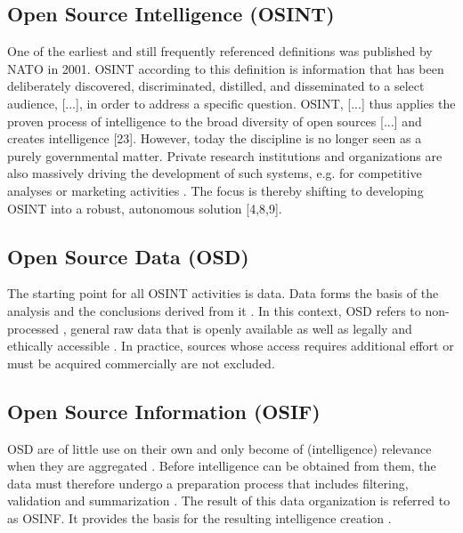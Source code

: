 \documentclass[10pt]{article}
\begin{document}
\subsection{Open Source Intelligence (OSINT)}

One of the earliest and still frequently referenced definitions \cite{DosPassos.2017}
was published by NATO in 2001. OSINT according to this definition is information that has been
deliberately discovered, discriminated, distilled, and disseminated to a select audience,
[...], in order to address a specific question. OSINT, [...] thus applies the proven
process of intelligence to the broad diversity of open sources [...] and creates
intelligence [23]. However, today the discipline is no longer seen as a purely governmental
matter. Private research institutions and organizations \cite{Bohm.2021,Mercado.2005} are
also massively driving the development of such systems, e.g. for competitive analyses or marketing activities
\cite{AlKilani.2021, Dokman.2020,Ghioni.2023}. The focus is thereby shifting to
developing OSINT into a robust, autonomous solution [4,8,9].

\subsection{Open Source Data (OSD)}

The starting point for all OSINT activities is data. Data forms the basis of the
analysis and the conclusions derived from it \cite{Gibson.2016}. In this context, OSD
refers to non-processed \cite{DosPassos.2017}, general raw data that is openly available
\cite{Burke.2007} as well as legally and ethically accessible
\cite{Schaurer.2010, NorthAtlanticTreatyOrganization.2001}. In practice, sources whose
access requires additional effort \cite{Bohm.2021} or must be acquired commercially
\cite{Williams.2018,NorthAtlanticTreatyOrganization.2001,JointChiefsofStaffU.S.Army.2013}
are not excluded.

\subsection{Open Source Information (OSIF)}

OSD are of little use on their own and only become of (intelligence) relevance when they
are aggregated \cite{Williams.2018}. Before intelligence can be obtained from them, the
data must therefore undergo a preparation process that includes filtering, validation and
summarization \cite{DosPassos.2017, NorthAtlanticTreatyOrganization.2001}. The result of this
data organization \cite{Schaurer.2010} is referred to as OSINF. It provides the basis for the
resulting intelligence creation \cite{DosPassos.2017,Schaurer.2010}.
\end{document}
